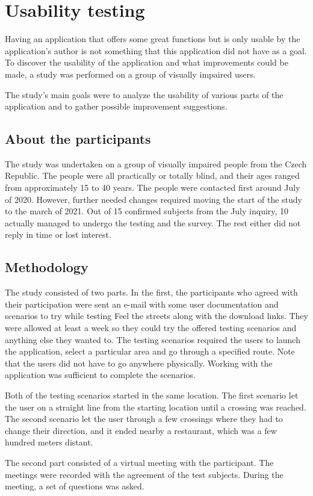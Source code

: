 \documentclass[nolof,digital]{fithesis3}
\begin{document}
\chapter{Usability testing}
Having an application that offers some great functions but is only usable by the application's author is not something that this application did not have as a goal. To discover the usability of the application and what improvements could be made, a study was performed on a group of visually impaired users.

The study's main goals were to analyze the usability of various parts of the application and to gather possible improvement suggestions.
\section{About the participants}
The study was undertaken on a group of visually impaired people from the Czech Republic. The people were all practically or totally blind, and their ages ranged from approximately 15 to 40 years. The people were contacted first around July of 2020. However, further needed changes required moving the start of the study to the march of 2021. Out of 15 confirmed subjects from the July inquiry, 10 actually managed to undergo the testing and the survey. The rest either did not reply in time or lost interest.
\section{Methodology}
The study consisted of two parts. In the first, the participants who agreed with their participation were sent an e-mail with some user documentation and scenarios to try while testing Feel the streets along with the download links. They were allowed at least a week so they could try the offered testing scenarios and anything else they wanted to. The testing scenarios required the users to launch the application, select a particular area and go through a specified route. Note that the users did not have to go anywhere physically. Working with the application was sufficient to complete the scenarios.

Both of the testing scenarios started in the same location. The first scenario let the user on a straight line from the starting location until a crossing was reached. The second scenario let the user through a few crossings where they had to change their direction, and it ended nearby a restaurant, which was a few hundred meters distant.

The second part consisted of a virtual meeting with the participant. The meetings were recorded with the agreement of the test subjects. During the meeting, a set of questions was asked.
\end{document}

